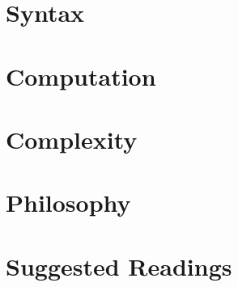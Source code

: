 \documentclass[12pt]{article}
\begin{document}
\newpage
\part{Syntax}

\newpage
\part{Computation}

\newpage
\part{Complexity}

\newpage
\part{Philosophy}

\newpage
\part{Suggested Readings}
\end{document}
